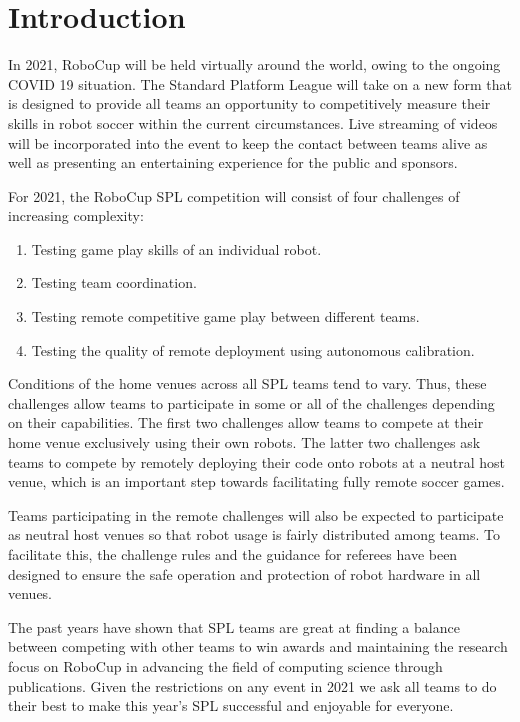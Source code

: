 \section{Introduction}

In 2021, RoboCup will be held virtually around the world, owing to the ongoing COVID 19 situation. The Standard Platform League will take on a new form that is designed to provide all teams an opportunity to competitively measure their skills in robot soccer within the current circumstances. 
Live streaming of videos will be incorporated into the event to keep the contact between teams alive as well as presenting an entertaining experience for the public and sponsors.

For 2021, the RoboCup SPL competition will consist of four challenges of increasing complexity:

\begin{enumerate}
    \item Testing game play skills of an individual robot. 
    \item Testing team coordination.
    \item Testing remote competitive game play between different teams. 
    \item Testing the quality of remote deployment using autonomous calibration.
\end{enumerate}

Conditions of the home venues across all SPL teams tend to vary. Thus, these challenges allow teams to participate in some or all of the challenges depending on their capabilities. The first two challenges allow teams to compete at their home venue exclusively using their own robots. The latter two challenges ask teams to compete by remotely deploying their code onto robots at a neutral host venue, which is an important step towards facilitating fully remote soccer games.

Teams participating in the remote challenges will also be expected to participate as neutral host venues so that robot usage is fairly distributed among teams. To facilitate this, the challenge rules and the guidance for referees have been designed to ensure the safe operation and protection of robot hardware in all venues.

The past years have shown that SPL teams are great at finding a balance between competing with other teams to win awards and maintaining the research focus on RoboCup in advancing the field of computing science through publications. Given the restrictions on any event in 2021 we ask all teams to do their best to make this year's SPL successful and enjoyable for everyone. 

